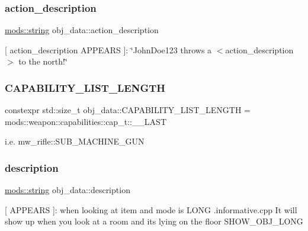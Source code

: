 \subsubsection{\texorpdfstring{action\+\_\+description}{action\_description}}
{\footnotesize\ttfamily \hyperlink{structmods_1_1string}{mods\+::string} obj\+\_\+data\+::action\+\_\+description}

\mbox{[} \textquotesingle{}action\+\_\+description\textquotesingle{} A\+P\+P\+E\+A\+RS \mbox{]}\+: \char`\"{}\+John\+Doe123 throws a $<$action\+\_\+description$>$ to the north!\char`\"{} \mbox{\label{structobj__data_a8cefe6b9b7e5e568f4cf758e60db2ce2}} 
\subsubsection{\texorpdfstring{C\+A\+P\+A\+B\+I\+L\+I\+T\+Y\+\_\+\+L\+I\+S\+T\+\_\+\+L\+E\+N\+G\+TH}{CAPABILITY\_LIST\_LENGTH}}
{\footnotesize\ttfamily constexpr std\+::size\+\_\+t obj\+\_\+data\+::\+C\+A\+P\+A\+B\+I\+L\+I\+T\+Y\+\_\+\+L\+I\+S\+T\+\_\+\+L\+E\+N\+G\+TH = mods\+::weapon\+::capabilities\+::cap\+\_\+t\+::\+\_\+\+\_\+\+L\+A\+ST\hspace{0.3cm}{\ttfamily [static]}}

i.\+e. mw\+\_\+rifle\+::\+S\+U\+B\+\_\+\+M\+A\+C\+H\+I\+N\+E\+\_\+\+G\+UN \mbox{\label{structobj__data_ac48d7cdab17efaf5e9664bbbf9a15ffb}} 
\subsubsection{\texorpdfstring{description}{description}}
{\footnotesize\ttfamily \hyperlink{structmods_1_1string}{mods\+::string} obj\+\_\+data\+::description}

\mbox{[} A\+P\+P\+E\+A\+RS \mbox{]}\+: when looking at item and mode is L\+O\+NG .informative.\+cpp It will show up when you look at a room and it\textquotesingle{}s lying on the floor S\+H\+O\+W\+\_\+\+O\+B\+J\+\_\+\+L\+O\+NG \mbox{\label{structobj__data_a6a6eff873924a8df3aa0562c425e477b}} 
